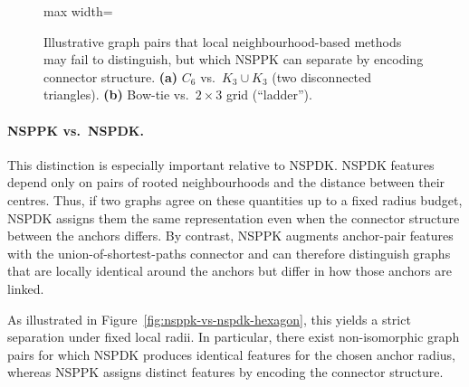 \begin{figure}[H]
\begin{adjustbox}{max width=\linewidth}
\end{adjustbox}
\caption{Illustrative graph pairs that local neighbourhood-based methods may fail
to distinguish, but which NSPPK can separate by encoding connector structure.
\textbf{(a)} \(C_6\) vs.\ \(K_3 \cup K_3\) (two disconnected triangles).
\textbf{(b)} Bow-tie vs.\ \(2\times3\) grid (“ladder”).}
\label{fig:isomorphism}
\end{figure}
\paragraph{NSPPK vs.\ NSPDK.}
This distinction is especially important relative to NSPDK.
NSPDK features depend only on pairs of rooted neighbourhoods and the distance
between their centres. Thus, if two graphs agree on these quantities up to a
fixed radius budget, NSPDK assigns them the same representation even when the
connector structure between the anchors differs. By contrast, NSPPK augments
anchor-pair features with the union-of-shortest-paths connector and can
therefore distinguish graphs that are locally identical around the anchors but
differ in how those anchors are linked.

As illustrated in Figure~\ref{fig:nsppk-vs-nspdk-hexagon}, this yields a
strict separation under fixed local radii. In particular, there exist
non-isomorphic graph pairs for which NSPDK produces identical features for the
chosen anchor radius, whereas NSPPK assigns distinct features by encoding the
connector structure.

